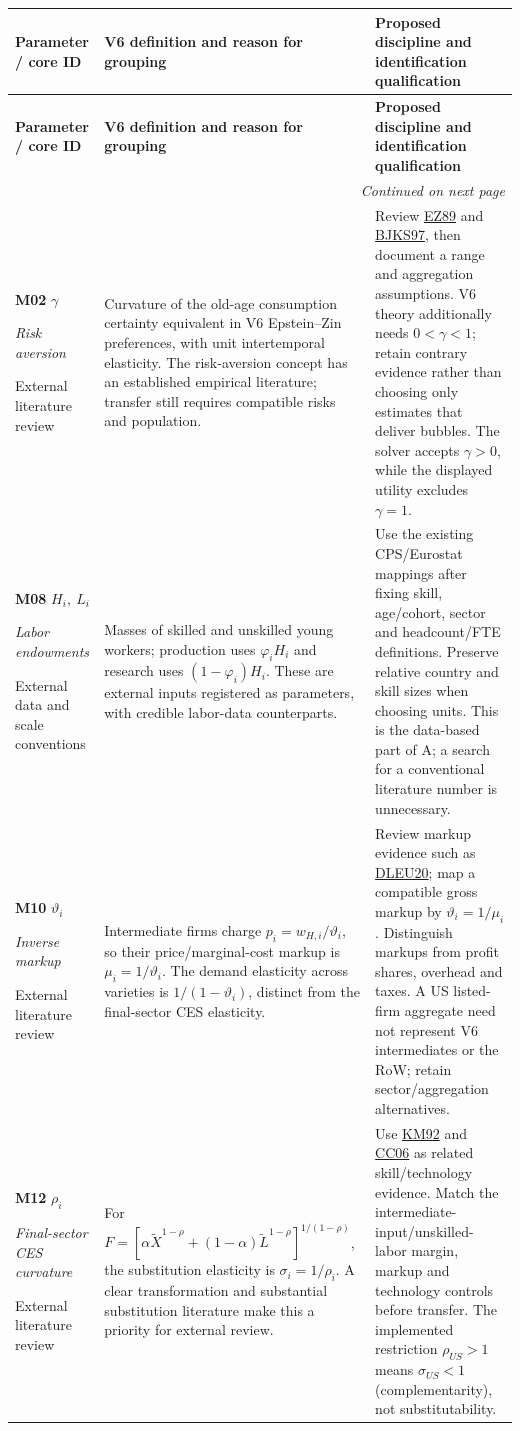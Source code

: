 \documentclass[10pt,a4paper,landscape]{article}
\makeatletter
\newcommand{\lit}[2]{\hyperlink{ref:#1}{#2}}
\newenvironment{grouptable}{%
\fontsize{9.4}{10.8}\selectfont\setlength{\parskip}{1.5pt}
\begin{longtable}{@{}P{\dimexpr .18\textwidth-6.67pt\relax}P{\dimexpr .385\textwidth-6.67pt\relax}P{\dimexpr .435\textwidth-6.66pt\relax}@{}}
\toprule\rowcolor{tablehead}\textbf{Parameter / core ID} & \textbf{V6 definition and reason for grouping} & \textbf{Proposed discipline and identification qualification}\\\midrule
\endfirsthead
\toprule\rowcolor{tablehead}\textbf{Parameter / core ID} & \textbf{V6 definition and reason for grouping} & \textbf{Proposed discipline and identification qualification}\\\midrule
\endhead
\midrule\multicolumn{3}{r}{\footnotesize\itshape Continued on next page}\\\endfoot
\bottomrule\endlastfoot
}{\end{longtable}}
\makeatother
\begin{document}
\begin{grouptable}
\textbf{M02} $\gamma$\par \textit{Risk aversion}\par {\footnotesize External literature review} & Curvature of the old-age consumption certainty equivalent in V6 Epstein--Zin preferences, with unit intertemporal elasticity. The risk-aversion concept has an established empirical literature; transfer still requires compatible risks and population. & Review \lit{EZ}{EZ89} and \lit{BJKS}{BJKS97}, then document a range and aggregation assumptions. V6 theory additionally needs $0<\gamma<1$; retain contrary evidence rather than choosing only estimates that deliver bubbles. The solver accepts $\gamma>0$, while the displayed utility excludes $\gamma=1$.\\[5pt]
\textbf{M08} $H_i,\ L_i$\par \textit{Labor endowments}\par {\footnotesize External data and scale conventions} & Masses of skilled and unskilled young workers; production uses $\varphi_iH_i$ and research uses $(1-\varphi_i)H_i$. These are external inputs registered as parameters, with credible labor-data counterparts. & Use the existing CPS/Eurostat mappings after fixing skill, age/cohort, sector and headcount/FTE definitions. Preserve relative country and skill sizes when choosing units. This is the data-based part of A; a search for a conventional literature number is unnecessary.\\[5pt]
\textbf{M10} $\vartheta_i$\par \textit{Inverse markup}\par {\footnotesize External literature review} & Intermediate firms charge $p_i=w_{H,i}/\vartheta_i$, so their price/marginal-cost markup is $\mu_i=1/\vartheta_i$. The demand elasticity across varieties is $1/(1-\vartheta_i)$, distinct from the final-sector CES elasticity. & Review markup evidence such as \lit{DLEU}{DLEU20}; map a compatible gross markup by $\vartheta_i=1/\mu_i$. Distinguish markups from profit shares, overhead and taxes. A US listed-firm aggregate need not represent V6 intermediates or the RoW; retain sector/aggregation alternatives.\\[5pt]
\textbf{M12} $\rho_i$\par \textit{Final-sector CES curvature}\par {\footnotesize External literature review} & For $F=[\alpha\widetilde X^{1-\rho}+(1-\alpha)\widetilde L^{1-\rho}]^{1/(1-\rho)}$, the substitution elasticity is $\sigma_i=1/\rho_i$. A clear transformation and substantial substitution literature make this a priority for external review. & Use \lit{KM}{KM92} and \lit{CC}{CC06} as related skill/technology evidence. Match the intermediate-input/unskilled-labor margin, markup and technology controls before transfer. The implemented restriction $\rho_{US}>1$ means $\sigma_{US}<1$ (complementarity), not substitutability.\\[5pt]
\end{grouptable}
\end{document}
